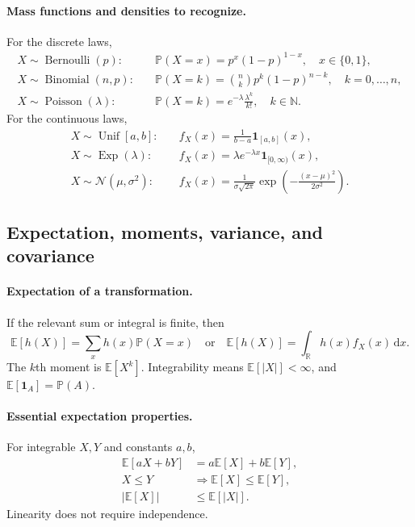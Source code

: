 \documentclass[11pt]{article}
\newcommand{\R}{\mathbb{R}}
\newcommand{\N}{\mathbb{N}}
\newcommand{\Pbb}{\mathbb{P}}
\newcommand{\E}{\mathbb{E}}
\newcommand{\dd}{\,\mathrm{d}}
\newcommand{\1}{\mathbf{1}}
\theoremstyle{plain}
\theoremstyle{definition}
\theoremstyle{remark}
\begin{document}
\paragraph{Mass functions and densities to recognize.}
For the discrete laws,
\begin{align*}
X\sim\operatorname{Bernoulli}(p):&\quad
\Pbb(X=x)=p^x(1-p)^{1-x},\quad x\in\{0,1\},\\
X\sim\operatorname{Binomial}(n,p):&\quad
\Pbb(X=k)=\binom nkp^k(1-p)^{n-k},\quad k=0,\ldots,n,\\
X\sim\operatorname{Poisson}(\lambda):&\quad
\Pbb(X=k)=e^{-\lambda}\frac{\lambda^k}{k!},\quad k\in\N.
\end{align*}
For the continuous laws,
\begin{align*}
X\sim\operatorname{Unif}[a,b]:&\quad
f_X(x)=\frac1{b-a}\1_{[a,b]}(x),\\
X\sim\operatorname{Exp}(\lambda):&\quad
f_X(x)=\lambda e^{-\lambda x}\1_{[0,\infty)}(x),\\
X\sim\mathcal N(\mu,\sigma^2):&\quad
f_X(x)=\frac1{\sigma\sqrt{2\pi}}
\exp\!\left(-\frac{(x-\mu)^2}{2\sigma^2}\right).
\end{align*}

\subsection{Expectation, moments, variance, and covariance}

\paragraph{Expectation of a transformation.}
If the relevant sum or integral is finite, then
\[
\E[h(X)]
=\sum_x h(x)\Pbb(X=x)
\quad\text{or}\quad
\E[h(X)]=\int_{\R}h(x)f_X(x)\dd x.
\]
The $k$th moment is $\E[X^k]$. Integrability means
$\E[|X|]<\infty$, and $\E[\1_A]=\Pbb(A)$.

\paragraph{Essential expectation properties.}
For integrable $X,Y$ and constants $a,b$,
\begin{align*}
\E[aX+bY]&=a\E[X]+b\E[Y],\\
X\le Y&\Longrightarrow \E[X]\le\E[Y],\\
|\E[X]|&\le\E[|X|].
\end{align*}
Linearity does not require independence.
\end{document}

